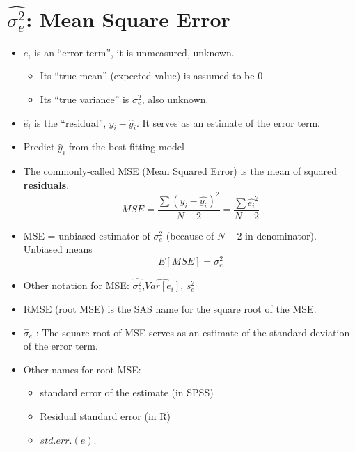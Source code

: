 \documentclass[10pt,english]{beamer}
\def\lyxframeend{} %
\begin{document}
\lyxframeend{}\section{$\widehat{\sigma_{e}^{2}}$: Mean Square Error}


\lyxframeend{}
\begin{itemize}
\item $e_{i}$ is an ``error term'', it is unmeasured, unknown. 

\begin{itemize}
\item Its ``true mean'' (expected value) is assumed to be 0
\item Its ``true variance'' is $\sigma_{e}^{2}$, also unknown.
\end{itemize}
\item $\hat{e}_{i}$ is the ``residual'', $y_{i}-\hat{y}_{i}$. It serves
as an estimate of the error term.
\end{itemize}

\lyxframeend{}
\begin{itemize}
\item Predict $\hat{y}_{i}$ from the best fitting model
\item The commonly-called MSE (Mean Squared Error) is the mean of squared
\textbf{residuals}.
\begin{equation}
MSE=\frac{\sum(y_{i}-\widehat{y_{i}})^{2}}{N-2}=\frac{\sum\widehat{e_{i}}^{2}}{N-2}\label{MSE}
\end{equation}

\item MSE = unbiased estimator of $\sigma_{e}^{2}$ (because of $N-2$ in
denominator). Unbiased means
\begin{equation}
E[MSE]=\sigma_{e}^{2}
\end{equation}

\item Other notation for MSE: $\widehat{\sigma_{e}^{2}}$,$\widehat{Var[e_{i}]}$,
$s_{e}^{2}$
\end{itemize}

\lyxframeend{}
\begin{itemize}
\item RMSE (root MSE) is the SAS name for the square root of the MSE.
\item $\hat{\sigma}_{e}$ : The square root of MSE serves as an estimate
of the standard deviation of the error term.
\item Other names for root MSE:

\begin{itemize}
\item standard error of the estimate (in SPSS)
\item Residual standard error (in R)
\item $std.err.(e)$. 
\end{itemize}
\end{itemize}
\end{document}
